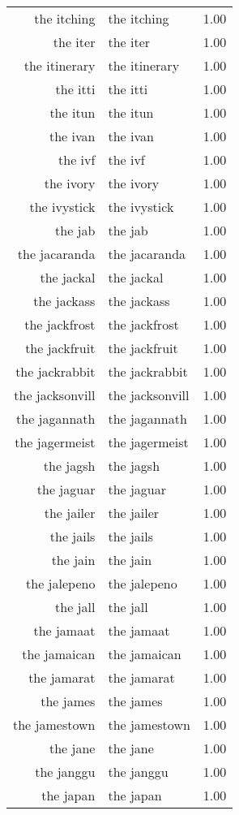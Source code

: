 \begin{table}[ht]
\begin{tabular}{rlr}
  the itching & the itching & 1.00 \\ 
  the iter & the iter & 1.00 \\ 
  the itinerary & the itinerary & 1.00 \\ 
  the itti & the itti & 1.00 \\ 
  the itun & the itun & 1.00 \\ 
  the ivan & the ivan & 1.00 \\ 
  the ivf & the ivf & 1.00 \\ 
  the ivory & the ivory & 1.00 \\ 
  the ivystick & the ivystick & 1.00 \\ 
  the jab & the jab & 1.00 \\ 
  the jacaranda & the jacaranda & 1.00 \\ 
  the jackal & the jackal & 1.00 \\ 
  the jackass & the jackass & 1.00 \\ 
  the jackfrost & the jackfrost & 1.00 \\ 
  the jackfruit & the jackfruit & 1.00 \\ 
  the jackrabbit & the jackrabbit & 1.00 \\ 
  the jacksonvill & the jacksonvill & 1.00 \\ 
  the jagannath & the jagannath & 1.00 \\ 
  the jagermeist & the jagermeist & 1.00 \\ 
  the jagsh & the jagsh & 1.00 \\ 
  the jaguar & the jaguar & 1.00 \\ 
  the jailer & the jailer & 1.00 \\ 
  the jails & the jails & 1.00 \\ 
  the jain & the jain & 1.00 \\ 
  the jalepeno & the jalepeno & 1.00 \\ 
  the jall & the jall & 1.00 \\ 
  the jamaat & the jamaat & 1.00 \\ 
  the jamaican & the jamaican & 1.00 \\ 
  the jamarat & the jamarat & 1.00 \\ 
  the james & the james & 1.00 \\ 
  the jamestown & the jamestown & 1.00 \\ 
  the jane & the jane & 1.00 \\ 
  the janggu & the janggu & 1.00 \\ 
  the japan & the japan & 1.00 \\ 

\end{tabular}
\end{table}
